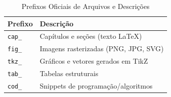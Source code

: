 \begin{table}[h]
    \centering
    \caption{Prefixos Oficiais de Arquivos e Descrições}
    \label{tab:nivi_tutorial_prefixos_descricoes}
    \begin{tabular}{ll}
        \hline
        \textbf{Prefixo} & \textbf{Descrição} \\
        \hline
        \texttt{cap\_} & Capítulos e seções (texto LaTeX) \\
        \texttt{fig\_} & Imagens rasterizadas (PNG, JPG, SVG) \\
        \texttt{tkz\_} & Gráficos e vetores gerados em TikZ \\
        \texttt{tab\_} & Tabelas estruturais \\
        \texttt{cod\_} & Snippets de programação/algoritmos \\
        \hline
    \end{tabular}
    
    \fonteNivelamento
\end{table}